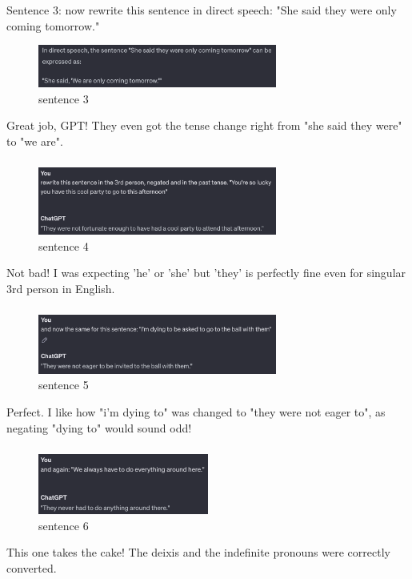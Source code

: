 \documentclass{article}
\begin{document}
\subsubsection{}	%
Sentence 3: now rewrite this sentence in direct speech: "She said they were only coming tomorrow." \\
\begin{figure}[H]
  \centering
  \includegraphics[width=0.7\textwidth]{2sen3.png} 
  \caption{sentence 3}
\end{figure}
Great job, GPT! They even got the tense change right from "she said they were" to "we are".

\subsubsection{}	%
\begin{figure}[H]
  \centering
  \includegraphics[width=0.7\textwidth]{2sen4.png} 
  \caption{sentence 4}
\end{figure}
Not bad! I was expecting 'he' or 'she' but 'they' is perfectly fine even for singular 3rd person in English. 

\subsubsection{}	%
\begin{figure}[H]
  \centering
  \includegraphics[width=0.7\textwidth]{2sen5.png} 
  \caption{sentence 5}
\end{figure}
Perfect. I like how "i'm dying to" was changed to "they were not eager to", as negating "dying to" would sound odd!

\subsubsection{}	%
\begin{figure}[H]
  \centering
  \includegraphics[width=0.5\textwidth]{2sen6.png} 
  \caption{sentence 6}
\end{figure}
This one takes the cake! The deixis and the indefinite pronouns were correctly converted. 
\end{document}
